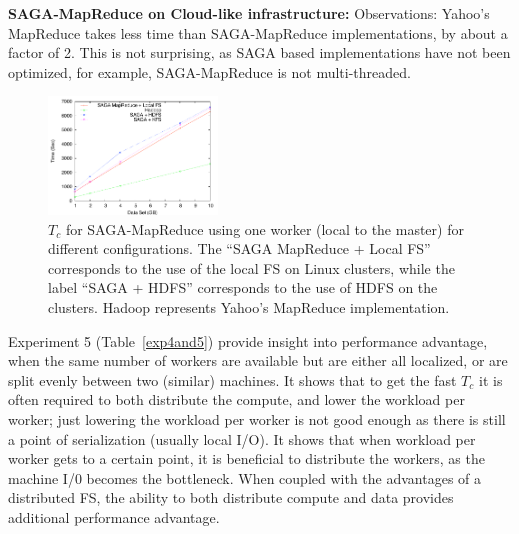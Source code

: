 \documentclass[conference,final]{IEEEtran}
\newcommand{\sagamapreduce }{SAGA-MapReduce }
\newcommand{\tc }{ $T_c$ }
\begin{document}
{\bf SAGA-MapReduce on Cloud-like infrastructure: } Observations:
Yahoo's MapReduce takes less time than \sagamapreduce implementations,
by about a factor of 2. This is not surprising, as SAGA based
implementations have not been optimized, for example, \sagamapreduce
is not multi-threaded.
\begin{figure}[t]
      \centering
          \includegraphics[width=0.40\textwidth]{mapreduce_timing_FS.pdf}
          \caption{\tc for \sagamapreduce using one worker (local to
            the master) for different configurations.  The ``SAGA
            MapReduce + Local FS'' corresponds to the use of the local
            FS on Linux clusters, while the label ``SAGA + HDFS''
            corresponds to the use of HDFS on the clusters. 
            Hadoop represents Yahoo's MapReduce implementation.}
      \label{saga_mapreduce_1worker.png}
\end{figure}
Experiment 5 (Table~\ref{exp4and5}) provide insight into performance
advantage, when the same number of workers are available but are
either all localized, or are split evenly between two (similar)
machines. It shows that to get the fast \tc it is often required to
both distribute the compute, and lower the workload per worker; just
lowering the workload per worker is not good enough as there is still
a point of serialization (usually local I/O).  It shows that when
workload per worker gets to a certain point, it is beneficial to
distribute the workers, as the machine I/0 becomes the bottleneck.
When coupled with the advantages of a distributed FS, the ability to
both distribute compute and data provides additional performance
advantage.
\end{document}
